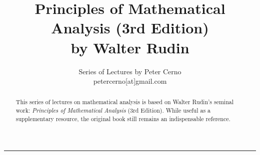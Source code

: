 \documentclass[10pt,varwidth=6in,margin=0.2in,preview]{standalone}
\title{
    Principles of Mathematical Analysis (3rd Edition)\\
    by Walter Rudin
}
\author{
    Series of Lectures by Peter Cerno\\
    \small petercerno[at]gmail.com
}
\begin{document}
\pagecolor{pagecolor}
\color{textcolor}


\date{}
\maketitle

\begin{abstract}
This series of lectures on mathematical analysis is based on Walter Rudin's seminal work: \emph{Principles of Mathematical Analysis} (3rd Edition). While useful as a supplementary resource, the original book still remains an indispensable reference.
\end{abstract}



\vspace{4in}

\hrule
\end{document}
